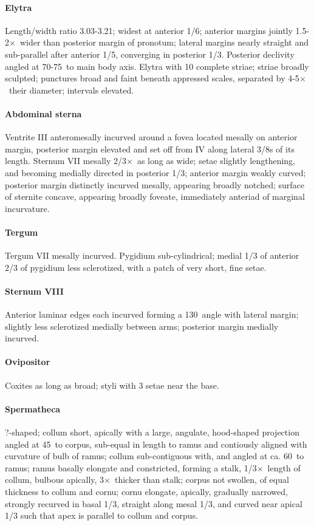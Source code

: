 \documentclass[fleqn,10pt,lineno]{wlpeerj} %
\newcommand{\td}{\textdegree~}
\newcommand{\x}{$\times$~}
\begin{document}
			\paragraph{Elytra}
				Length/width ratio 3.03-3.21; widest at anterior 1/6; anterior margins jointly 1.5-2\x wider than posterior margin of pronotum; lateral margins nearly straight and sub-parallel after anterior 1/5, converging in posterior 1/3. 
				Posterior declivity angled at 70-75\td to main body axis. Elytra with 10 complete striae; striae broadly sculpted; punctures broad and faint beneath appressed scales, separated by 4-5\x their diameter; intervals elevated.
			\paragraph{Abdominal sterna}
				Ventrite III anteromesally incurved around a fovea located mesally on anterior margin, posterior margin elevated and set off from IV along lateral 3/8s of its length. 
				Sternum VII mesally 2/3\x as long as wide; setae slightly lengthening, and becoming medially directed in posterior 1/3; anterior margin weakly curved; posterior margin distinctly incurved mesally, appearing broadly notched; surface of sternite concave, appearing broadly foveate, immediately anteriad of marginal incurvature.
			\paragraph{Tergum}
				Tergum VII mesally incurved.
				Pygidium sub-cylindrical; medial 1/3 of anterior 2/3 of pygidium less sclerotized, with a patch of very short, fine setae.
			\paragraph{Sternum VIII}
				Anterior laminar edges each incurved forming a 130\td angle with lateral margin; slightly less sclerotized medially between arms; posterior margin medially incurved.
			\paragraph{Ovipositor}
				Coxites as long as broad; styli with 3 setae near the base.
			\paragraph{Spermatheca}
				?-shaped; collum short, apically with a large, angulate, hood-shaped projection angled at 45\td to corpus, sub-equal in length to ramus and contiously aligned with curvature of bulb of ramus; collum sub-contiguous with, and angled at ca. 60\td to ramus; ramus basally elongate and constricted, forming a stalk, 1/3\x length of collum, bulbous apically, 3\x thicker than stalk; corpus not swollen, of equal thickness to collum and cornu; cornu elongate, apically, gradually narrowed, strongly recurved in basal 1/3, straight along mesal 1/3, and curved near apical 1/3 such that apex is parallel to collum and corpus.
\end{document}
